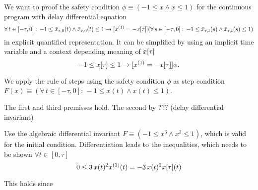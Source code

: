 \documentclass[10pt]{report}
\begin{document}
            We want to proof the safety condition $\phi\equiv(-1\leq x\wedge x\leq 1)$ for the continuous program with delay differential equation
            \begin{equation}
                \forall\,t\in[-\tau,0]:\,-1\leq\xbartaut{0}(t)\wedge\xbartaut{0}(t)\leq 1
                \rightarrow
                [\D{x}=-\xtau] (\forall\,s\in[-\tau,0]:\,-1\leq\xbartaut{t}(s)\wedge\xbartaut{t}(s)\leq 1)
            \end{equation}
            in explicit quantified representation. It can be simplified by using an implicit time variable and a context depending meaning of $x[\tau]$
            \begin{equation}
                -1\leq\xtau\leq 1 \rightarrow [\D{x}=-\xtau]\phi.
            \end{equation}

            We apply the rule of steps using the safety condition $\phi$ as step condition $F(x)\equiv(\forall\,t\in[-\tau,0]:\,-1\leq x(t)\wedge x(t)\leq 1)$.

            The first and third premisses hold. The second by ??? (delay differential invariant)

            Use the algebraic differential invariant $F\equiv(-1\leq x^3\wedge x^3\leq1)$, which is valid for the initial condition. Differentiation leads to the inequalities, which needs to be shown $\forall t\in[0,\tau]$
            \begin{equation}
                0\leq 3\,x(t)^2 \D{x}(t) = -3\,x(t)^2 \xtau(t)
            \end{equation}

            This holds since



\nocite{*}


\end{document}
